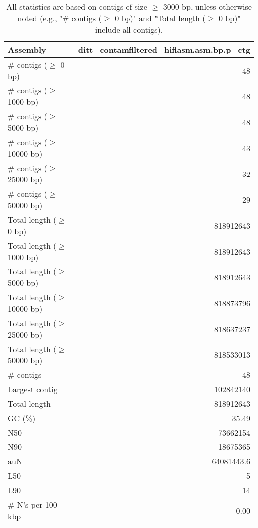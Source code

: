 \documentclass[12pt,a4paper]{article}
\begin{document}
\begin{table}[ht]
\begin{center}
\caption{All statistics are based on contigs of size $\geq$ 3000 bp, unless otherwise noted (e.g., "\# contigs ($\geq$ 0 bp)" and "Total length ($\geq$ 0 bp)" include all contigs).}
\begin{tabular}{|l*{1}{|r}|}
\hline
Assembly & ditt\_contamfiltered\_hifiasm.asm.bp.p\_ctg \\ \hline
\# contigs ($\geq$ 0 bp) & 48 \\ \hline
\# contigs ($\geq$ 1000 bp) & 48 \\ \hline
\# contigs ($\geq$ 5000 bp) & 48 \\ \hline
\# contigs ($\geq$ 10000 bp) & 43 \\ \hline
\# contigs ($\geq$ 25000 bp) & 32 \\ \hline
\# contigs ($\geq$ 50000 bp) & 29 \\ \hline
Total length ($\geq$ 0 bp) & 818912643 \\ \hline
Total length ($\geq$ 1000 bp) & 818912643 \\ \hline
Total length ($\geq$ 5000 bp) & 818912643 \\ \hline
Total length ($\geq$ 10000 bp) & 818873796 \\ \hline
Total length ($\geq$ 25000 bp) & 818637237 \\ \hline
Total length ($\geq$ 50000 bp) & 818533013 \\ \hline
\# contigs & 48 \\ \hline
Largest contig & 102842140 \\ \hline
Total length & 818912643 \\ \hline
GC (\%) & 35.49 \\ \hline
N50 & 73662154 \\ \hline
N90 & 18675365 \\ \hline
auN & 64081443.6 \\ \hline
L50 & 5 \\ \hline
L90 & 14 \\ \hline
\# N's per 100 kbp & 0.00 \\ \hline
\end{tabular}
\end{center}
\end{table}
\end{document}
